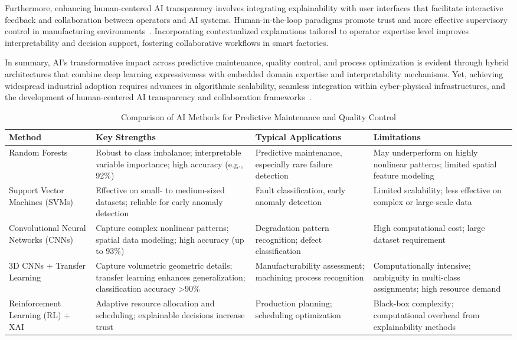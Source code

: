 \documentclass[sigconf]{acmart}
\begin{document}
Furthermore, enhancing human-centered AI transparency involves integrating explainability with user interfaces that facilitate interactive feedback and collaboration between operators and AI systems. Human-in-the-loop paradigms promote trust and more effective supervisory control in manufacturing environments~\cite{ref38,ref9}. Incorporating contextualized explanations tailored to operator expertise level improves interpretability and decision support, fostering collaborative workflows in smart factories.

In summary, AI's transformative impact across predictive maintenance, quality control, and process optimization is evident through hybrid architectures that combine deep learning expressiveness with embedded domain expertise and interpretability mechanisms. Yet, achieving widespread industrial adoption requires advances in algorithmic scalability, seamless integration within cyber-physical infrastructures, and the development of human-centered AI transparency and collaboration frameworks~\cite{ref9,ref24,ref36}.

\begin{table*}[htbp]
\centering
\caption{Comparison of AI Methods for Predictive Maintenance and Quality Control}
\label{tab:method_comparison}
\begin{adjustbox}{max width=\textwidth}
\begin{tabular}{@{}llll@{}}
\toprule
\textbf{Method} & \textbf{Key Strengths} & \textbf{Typical Applications} & \textbf{Limitations} \\
\toprule
Random Forests & Robust to class imbalance; interpretable variable importance; high accuracy (e.g., 92\%) & Predictive maintenance, especially rare failure detection & May underperform on highly nonlinear patterns; limited spatial feature modeling \\
Support Vector Machines (SVMs) & Effective on small- to medium-sized datasets; reliable for early anomaly detection & Fault classification, early anomaly detection & Limited scalability; less effective on complex or large-scale data \\
Convolutional Neural Networks (CNNs) & Capture complex nonlinear patterns; spatial data modeling; high accuracy (up to 93\%) & Degradation pattern recognition; defect classification & High computational cost; large dataset requirement \\
3D CNNs + Transfer Learning & Capture volumetric geometric details; transfer learning enhances generalization; classification accuracy >90\% & Manufacturability assessment; machining process recognition & Computationally intensive; ambiguity in multi-class assignments; high resource demand \\
Reinforcement Learning (RL) + XAI & Adaptive resource allocation and scheduling; explainable decisions increase trust & Production planning; scheduling optimization & Black-box complexity; computational overhead from explainability methods \\
\bottomrule
\end{tabular}
\end{adjustbox}
\end{table*}
\end{document}
